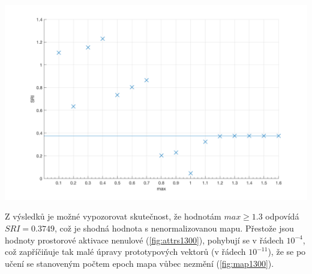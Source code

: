 \documentclass[thesis=M,czech]{FITthesis}[2012/06/26]
\begin{document}
\begin{minipage}{\textwidth}
\begin{minipage}[b]{0.19\textwidth}
\begin{tabular}{|l|c|}
        \end{tabular}
      \label{tab:sri}
    \end{minipage}
  \hfill
  \begin{minipage}[b]{0.79\textwidth}
    \centering
    \includegraphics[scale=0.2]{sri_scatter.png}
    \label{fig:sriscatter}
  \end{minipage} 
  \end{minipage}
\vspace{\baselineskip}
\noindent


Z výsledků je možné vypozorovat skutečnost, že hodnotám $max\geq1.3$ odpovídá $SRI=0.3749$, což je shodná hodnota s nenormalizovanou mapu. Přestože jsou hodnoty prostorové aktivace nenulové (\ref{fig:attrs1300}), pohybují se v řádech $10^{-4}$, což zapříčiňuje tak malé úpravy prototypových vektorů (v řádech $10^{-11}$), že se po učení se stanoveným počtem epoch mapa vůbec nezmění (\ref{fig:map1300}).
\end{document}
